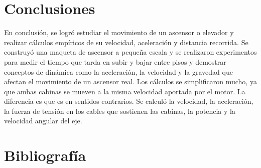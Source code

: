 \documentclass{article}
\theoremstyle{mytheoremstyle}
\theoremstyle{mytheoremstyle}
\theoremstyle{myproblemstyle}
\begin{document}
    \section*{Conclusiones}
    En conclusión, se logró estudiar el movimiento de un ascensor o elevador y realizar cálculos empíricos de su velocidad, aceleración y distancia recorrida. Se construyó una maqueta de ascensor a pequeña escala y se realizaron experimentos para medir el tiempo que tarda en subir y bajar entre pisos y demostrar conceptos de dinámica como la aceleración, la velocidad y la gravedad que afectan el movimiento de un ascensor real. Los cálculos se simplificaron mucho, ya que ambas cabinas se mueven a la misma velocidad aportada por el motor. La diferencia es que es en sentidos contrarios. Se calculó la velocidad, la aceleración, la fuerza de tensión en los cables que sostienen las cabinas, la potencia y la velocidad angular del eje.
    
    \newpage
    \printbibliography[title={Bibliografía}]
    \section*{Bibliografía}

    
\end{document}
